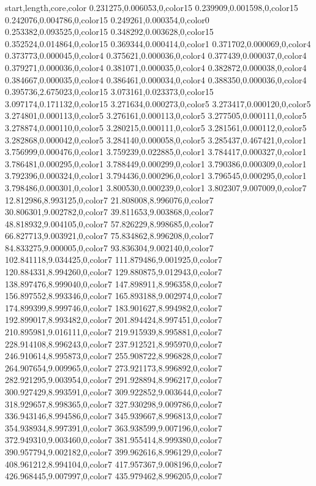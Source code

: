 start,length,core,color
0.231275,0.006053,0,color15
0.239909,0.001598,0,color15
0.242076,0.004786,0,color15
0.249261,0.000354,0,color0
0.253382,0.093525,0,color15
0.348292,0.003628,0,color15
0.352524,0.014864,0,color15
0.369344,0.000414,0,color1
0.371702,0.000069,0,color4
0.373773,0.000045,0,color4
0.375621,0.000036,0,color4
0.377439,0.000037,0,color4
0.379271,0.000036,0,color4
0.381071,0.000035,0,color4
0.382872,0.000038,0,color4
0.384667,0.000035,0,color4
0.386461,0.000034,0,color4
0.388350,0.000036,0,color4
0.395736,2.675023,0,color15
3.073161,0.023373,0,color15
3.097174,0.171132,0,color15
3.271634,0.000273,0,color5
3.273417,0.000120,0,color5
3.274801,0.000113,0,color5
3.276161,0.000113,0,color5
3.277505,0.000111,0,color5
3.278874,0.000110,0,color5
3.280215,0.000111,0,color5
3.281561,0.000112,0,color5
3.282868,0.000042,0,color5
3.284140,0.000058,0,color5
3.285437,0.467421,0,color1
3.756999,0.000476,0,color1
3.759239,0.022885,0,color1
3.784417,0.000327,0,color1
3.786481,0.000295,0,color1
3.788449,0.000299,0,color1
3.790386,0.000309,0,color1
3.792396,0.000324,0,color1
3.794436,0.000296,0,color1
3.796545,0.000295,0,color1
3.798486,0.000301,0,color1
3.800530,0.000239,0,color1
3.802307,9.007009,0,color7
12.812986,8.993125,0,color7
21.808008,8.996076,0,color7
30.806301,9.002782,0,color7
39.811653,9.003868,0,color7
48.818932,9.004105,0,color7
57.826229,8.998685,0,color7
66.827713,9.003921,0,color7
75.834862,8.996208,0,color7
84.833275,9.000005,0,color7
93.836304,9.002140,0,color7
102.841118,9.034425,0,color7
111.879486,9.001925,0,color7
120.884331,8.994260,0,color7
129.880875,9.012943,0,color7
138.897476,8.999040,0,color7
147.898911,8.996358,0,color7
156.897552,8.993346,0,color7
165.893188,9.002974,0,color7
174.899399,8.999746,0,color7
183.901627,8.994982,0,color7
192.899017,8.993482,0,color7
201.894424,8.997451,0,color7
210.895981,9.016111,0,color7
219.915939,8.995881,0,color7
228.914108,8.996243,0,color7
237.912521,8.995970,0,color7
246.910614,8.995873,0,color7
255.908722,8.996828,0,color7
264.907654,9.009965,0,color7
273.921173,8.996892,0,color7
282.921295,9.003954,0,color7
291.928894,8.996217,0,color7
300.927429,8.993591,0,color7
309.922852,9.003644,0,color7
318.929657,8.998365,0,color7
327.930298,9.009786,0,color7
336.943146,8.994586,0,color7
345.939667,8.996813,0,color7
354.938934,8.997391,0,color7
363.938599,9.007196,0,color7
372.949310,9.003460,0,color7
381.955414,8.999380,0,color7
390.957794,9.002182,0,color7
399.962616,8.996129,0,color7
408.961212,8.994104,0,color7
417.957367,9.008196,0,color7
426.968445,9.007997,0,color7
435.979462,8.996205,0,color7
